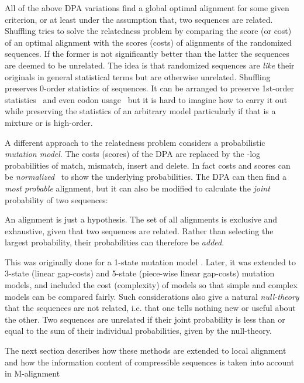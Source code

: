 \documentclass[letterpaper,11pt,oneside]{article}
\begin{document}
\begin{multicols}{2}
All of the above DPA variations find a global optimal alignment for
some given criterion, or at least under the assumption that,
two sequences are related.
Shuffling tries to solve the relatedness problem by comparing the
score (or cost) of an optimal alignment with the scores (costs)
of alignments of the randomized sequences.
If the former is not significantly better than the latter
the sequences are deemed to be unrelated.
The idea is that randomized sequences are {\em like} their originals in
general statistical terms but are otherwise unrelated.
Shuffling preserves 0-order statistics of sequences.
It can be arranged to preserve 1st-order statistics~\cite{fitch83}
and even codon usage~\cite{altschul85} but it is hard to imagine how
to carry it out while preserving the statistics of an arbitrary model
particularly if that is a mixture or is high-order.

A different approach to the relatedness problem
considers a probabilistic {\em mutation model}.
The costs (scores) of the DPA are replaced by the -log probabilities
of match, mismatch, insert and delete.
In fact costs and scores can be {\em normalized}~\cite{allison93a} to show
the underlying probabilities.
The DPA can then find a {\em most probable} alignment, but it can also
be modified to calculate the {\em joint} probability of two sequences:

\begin{minipage}{0.9\columnwidth}
An alignment is just a hypothesis.
The set of all alignments is exclusive and exhaustive, given that
two sequences are related.
Rather than selecting the largest probability,
their probabilities can therefore be {\em added}.
\vspace{0.5em}
\end{minipage}
\noindent
This was originally done for a 1-state mutation model \cite{bishop86}.
Later, it was extended \cite{allison92a} to 3-state (linear gap-costs)
and 5-state (piece-wise linear gap-costs) mutation models,
and included the cost (complexity) of models so that simple
and complex models can be compared fairly.
Such considerations also give
a natural {\em null-theory} that the sequences are not related,
i.e. that one tells nothing new or useful about the other.
Two sequences are unrelated if their joint probability is less than or equal
to the sum of their individual probabilities, given by the null-theory.

The next section describes how these methods
are extended to local alignment and how the information
content of compressible sequences is taken into account in M-alignment



\end{multicols}
\end{document}
